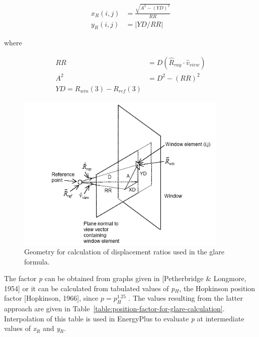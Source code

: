 \begin{equation}
\begin{array}{rl}
    x_R(i,j) & = \frac{\sqrt{A^2-(YD)^2}}{RR} \\
    y_R(i,j) & = \left|YD/RR\right|
\end{array}
\end{equation}

where

\begin{equation}
\begin{array}{rl}
    RR & = D (\hat{R}_{ray}\cdot\hat{v}_{view}) \\
    A^2 & = D^2 - (RR)^2 \\
    YD = R_{win}(3) - R_{ref}(3)
\end{array}
\end{equation}

\begin{figure}[hbtp] %
\centering
\includegraphics[width=0.9\textwidth, height=0.9\textheight, keepaspectratio=true]{media/image794.png}
\caption{  Geometry for calculation of displacement ratios used in the glare formula. \protect \label{fig:geometry-for-calculation-of-displacement}}
\end{figure}

The factor \emph{p} can be obtained from graphs given in {[}Petherbridge \& Longmore, 1954{]} or it can be calculated from tabulated values of \emph{p\(_{H}\)}, the Hopkinson position factor {[}Hopkinson, 1966{]}, since \(p = p_H^{1.25}\) . The values resulting from the latter approach are given in Table~\ref{table:position-factor-for-glare-calculation}. Interpolation of this table is used in EnergyPlus to evaluate \emph{p} at intermediate values of \emph{x\(_{R}\)} and \emph{y\(_{R}\)}.

